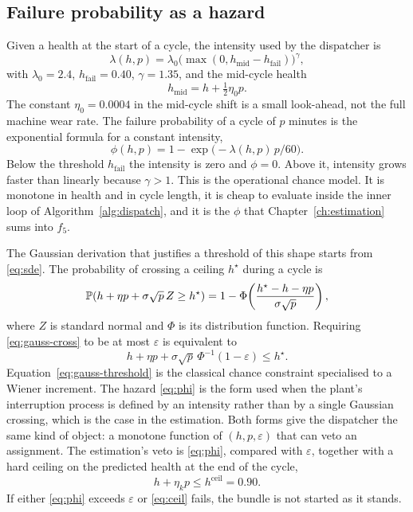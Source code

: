 \subsection{Failure probability as a hazard}

Given a health at the start of a cycle, the intensity used by the dispatcher is
\begin{equation}
\lambda(h, p) = \lambda_0 \big(\max(0, h_{\mathrm{mid}} - h_{\mathrm{fail}})\big)^{\gamma} ,
\label{eq:hazard}
\end{equation}
with \(\lambda_0 = 2.4\), \(h_{\mathrm{fail}} = 0.40\), \(\gamma = 1.35\), and the mid-cycle health
\begin{equation}
h_{\mathrm{mid}} = h + \tfrac{1}{2} \eta_0 p .
\label{eq:mid}
\end{equation}
The constant \(\eta_0 = 0.0004\) in the mid-cycle shift is a small look-ahead, not the full machine wear rate. The failure probability of a cycle of \(p\) minutes is the exponential formula for a constant intensity,
\begin{equation}
\phi(h, p) = 1 - \exp\!\big(-\lambda(h,p) \, p / 60\big) .
\label{eq:phi}
\end{equation}
Below the threshold \(h_{\mathrm{fail}}\) the intensity is zero and \(\phi = 0\). Above it, intensity grows faster than linearly because \(\gamma > 1\). This is the operational chance model. It is monotone in health and in cycle length, it is cheap to evaluate inside the inner loop of Algorithm~\ref{alg:dispatch}, and it is the \(\phi\) that Chapter~\ref{ch:estimation} sums into \(f_5\).

The Gaussian derivation that justifies a threshold of this shape starts from \eqref{eq:sde}. The probability of crossing a ceiling \(h^{\star}\) during a cycle is
\begin{equation}
\mathbb{P}(h + \eta p + \sigma \sqrt{p}\, Z \ge h^{\star}) = 1 - \Phi\!\left( \frac{h^{\star} - h - \eta p}{\sigma \sqrt{p}} \right) ,
\label{eq:gauss-cross}
\end{equation}
where \(Z\) is standard normal and \(\Phi\) is its distribution function. Requiring \eqref{eq:gauss-cross} to be at most \(\varepsilon\) is equivalent to
\begin{equation}
h + \eta p + \sigma \sqrt{p}\, \Phi^{-1}(1-\varepsilon) \le h^{\star} .
\label{eq:gauss-threshold}
\end{equation}
Equation~\eqref{eq:gauss-threshold} is the classical chance constraint \cite{charnes1959} specialised to a Wiener increment. The hazard \eqref{eq:phi} is the form used when the plant's interruption process is defined by an intensity rather than by a single Gaussian crossing, which is the case in the estimation. Both forms give the dispatcher the same kind of object: a monotone function of \((h,p,\varepsilon)\) that can veto an assignment. The estimation's veto is \eqref{eq:phi}, compared with \(\varepsilon\), together with a hard ceiling on the predicted health at the end of the cycle,
\begin{equation}
h + \eta_k p \le h^{\mathrm{ceil}} = 0.90 .
\label{eq:ceil}
\end{equation}
If either \eqref{eq:phi} exceeds \(\varepsilon\) or \eqref{eq:ceil} fails, the bundle is not started as it stands.

